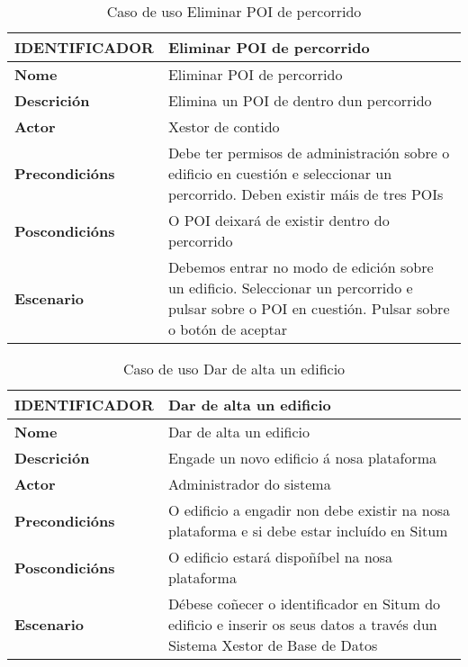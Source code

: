 \begin{table}[tbp]
	\begin{tabular}{|l|p{10cm}|}
		\hline 
		\textbf{IDENTIFICADOR}	& \textbf{Eliminar POI de percorrido} \\ 
		\hline 
		\textbf{Nome} & Eliminar POI de percorrido \\ 
		\hline 
		\textbf{Descrición} & Elimina un POI de dentro dun percorrido \\ 
		\hline 
		\textbf{Actor} & Xestor de contido \\ 
		\hline 
		\textbf{Precondicións} & Debe ter permisos de administración sobre o edificio en cuestión e seleccionar un percorrido. Deben existir máis de tres POIs \\ 
		\hline 
		\textbf{Poscondicións} & O POI deixará de existir dentro do percorrido \\ 
		\hline 
		\textbf{Escenario} & Debemos entrar no modo de edición sobre un edificio. Seleccionar un percorrido e pulsar sobre o POI en cuestión. Pulsar sobre o botón de aceptar \\ 
		\hline 
	\end{tabular}
	\caption{Caso de uso Eliminar POI de percorrido}
	\label{tab:cuEliminarPOIPercorrido}
\end{table}

\begin{table}[tbp]
	\begin{tabular}{|l|p{10cm}|}
		\hline 
		\textbf{IDENTIFICADOR}	& \textbf{Dar de alta un edificio} \\ 
		\hline 
		\textbf{Nome} & Dar de alta un edificio \\ 
		\hline 
		\textbf{Descrición} & Engade un novo edificio á nosa plataforma \\ 
		\hline 
		\textbf{Actor} & Administrador do sistema \\ 
		\hline 
		\textbf{Precondicións} & O edificio a engadir non debe existir na nosa plataforma e si debe estar incluído en Situm \\ 
		\hline 
		\textbf{Poscondicións} & O edificio estará dispoñíbel na nosa plataforma \\ 
		\hline 
		\textbf{Escenario} & Débese coñecer o identificador en Situm do edificio e inserir os seus datos a través dun Sistema Xestor de Base de Datos \\ 
		\hline 
	\end{tabular}
	\caption{Caso de uso Dar de alta un edificio}
	\label{tab:cuAltaEdificio}
\end{table}

